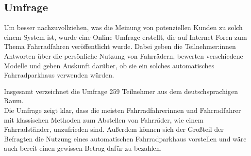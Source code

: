 \subsection{Umfrage}
Um besser nachzuvollziehen, was die Meinung von potenziellen Kunden zu solch einem System ist, wurde eine Online-Umfrage erstellt, die auf Internet-Foren zum Thema Fahrradfahren veröffentlicht wurde. Dabei geben die Teilnehmer:innen Antworten über die persönliche Nutzung von Fahrrädern, bewerten verschiedene Modelle und geben Auskunft darüber, ob sie ein solches automatisches Fahrradparkhaus verwenden würden.

\smallskip \noindent Insgesamt verzeichnet die Umfrage 259 Teilnehmer aus dem deutschsprachigen Raum. \\
\smallskip \noindent Die Umfrage zeigt klar, dass die meisten Fahrradfahrerinnen und Fahrradfahrer mit klassischen Methoden zum Abstellen von Fahrräder, wie einem Fahrradständer, unzufrieden sind. Außerdem können sich der Großteil der Befragten die Nutzung eines automatischen Fahrradparkhaus vorstellen und wäre auch bereit einen gewissen Betrag dafür zu bezahlen.
